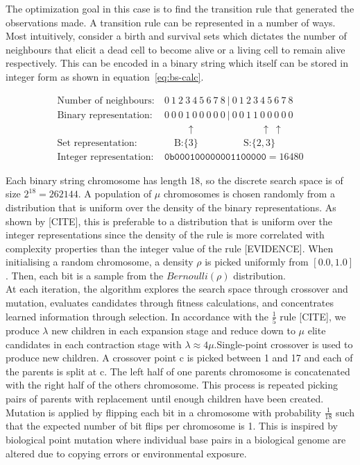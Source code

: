 The optimization goal in this case is to find the transition rule that generated the observations made. A transition rule can be represented in a number of ways. Most intuitively, consider a birth and survival sets which dictates the number of neighbours that elicit a dead cell to become alive or a living cell to remain alive respectively. This can be encoded in a binary string which itself can be stored in integer form as shown in equation~\ref{eq:bs-calc}.

\begin{equation} \label{eq:bs-calc}
\begin{split}
    \text{Number of neighbours:}&\ 0\ 1\ 2\ 3\ 4\ 5\ 6\ 7\ 8\ |\ 0\ 1\ 2\ 3\ 4\ 5\ 6\ 7\ 8\\
    \text{Binary representation:}&\ 0\ 0\ 0\ 1\ 0\ 0\ 0\ 0\ 0\ |\ 0\ 0\ 1\ 1\ 0\ 0\ 0\ 0\ 0\\
    &\qquad\ \: \uparrow \qquad \qquad \qquad \ \: \: \uparrow \ \uparrow\\
    \text{Set representation:}&\quad \ \text{B:} \{3\} \qquad \qquad \ \ \: \text{S:}\{2, 3\}\\
    \text{Integer representation:}&\ \texttt{0b000100000001100000} = 16480
\end{split}   
\end{equation}

Each binary string chromosome has length 18, so the discrete search space is of size $2^{18} = 262144$. A population of $\mu$ chromosomes is chosen randomly from a distribution that is uniform over the density of the binary representations. As shown by [CITE], this is preferable to a distribution that is uniform over the integer representations since the density of the rule is more correlated with complexity properties than the integer value of the rule [EVIDENCE]. When initialising a random chromosome, a density $\rho$ is picked uniformly from $[0.0, 1.0]$. Then, each bit is a sample from the $\mathit{Bernoulli}(\rho)$ distribution.\\

At each iteration, the algorithm explores the search space through crossover and mutation, evaluates candidates through fitness calculations, and concentrates learned information through selection. In accordance with the $\frac{1}{5}$ rule [CITE], we produce $\lambda$ new children in each expansion stage and reduce down to $\mu$ elite candidates in each contraction stage with $\lambda \approx 4\mu$.Single-point crossover is used to produce new children. A crossover point c is picked between 1 and 17 and each of the parents is split at c. The left half of one parents chromosome is concatenated with the right half of the others chromosome. This process is repeated picking pairs of parents with replacement until enough children have been created.  Mutation is applied by flipping each bit in a chromosome with probability $\frac{1}{18}$ such that the expected number of bit flips per chromosome is 1. This is inspired by biological point mutation where individual base pairs in a biological genome are altered due to copying errors or environmental exposure.\\

